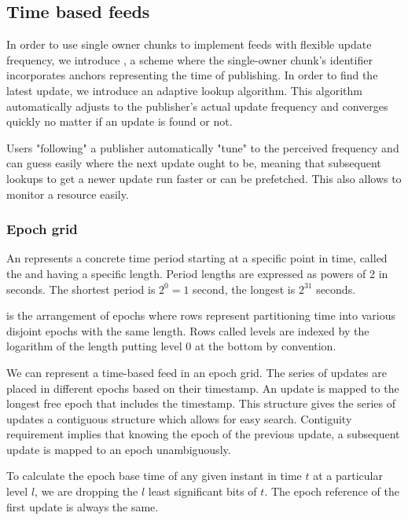 \subsection{Time based feeds}\label{sec:time-based-feeds}

\red{}

In order to use single owner chunks to implement feeds  with flexible update frequency, we introduce , a scheme where the single-owner chunk's identifier incorporates anchors representing the time of publishing.
In order to find the latest update, we introduce
an adaptive lookup algorithm. This algorithm automatically adjusts to the publisher's actual update frequency and converges quickly no  matter if an update is found or not.

Users "following" a publisher automatically "tune" to the perceived frequency and can guess easily where the next update ought to be, meaning that subsequent lookups to get a newer update run faster or can be prefetched. This also allows to monitor a resource easily.

\subsubsection{Epoch grid}

An  represents a concrete time period starting at a specific point in time, called the  and having a specific length.  
Period lengths are expressed as powers of 2 in seconds. The shortest period is $2^0 = 1$ second,  the longest is $2^{31}$ seconds. 

 is the arrangement of epochs where rows represent partitioning time into various disjoint epochs with the same length. 
Rows called levels are indexed by the logarithm of the length putting level 0 at the bottom by convention.



We can represent a time-based feed in an epoch grid. The series of updates are placed in different epochs based on  their timestamp. An update is mapped to the longest free epoch that includes the timestamp. This structure gives the series of updates a contiguous structure which allows for easy search. Contiguity requirement implies that knowing the epoch of the previous update, a subsequent update is mapped to an epoch unambiguously.

To calculate the epoch base time of any given instant in time $t$ at a particular level $l$, we are dropping the $l$ least significant bits of $t$. The epoch reference of the first update is always the same.


